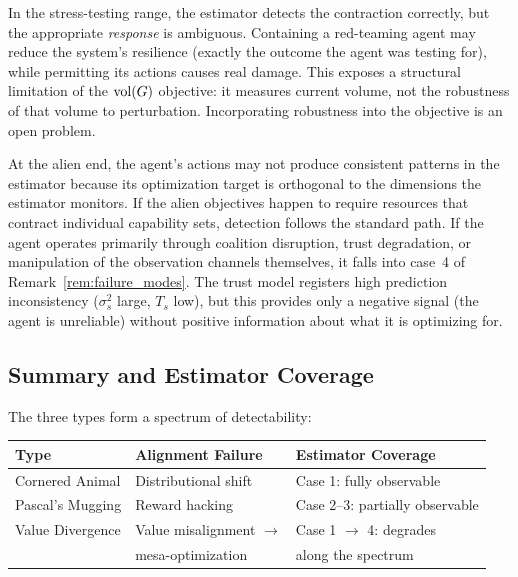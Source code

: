 In the stress-testing range, the estimator detects the contraction correctly,
but the appropriate \emph{response} is ambiguous. Containing a red-teaming
agent may reduce the system's resilience (exactly the outcome the agent was
testing for), while permitting its actions causes real damage. This exposes a
structural limitation of the $\operatorname{vol}(G)$ objective: it measures current volume,
not the robustness of that volume to perturbation. Incorporating robustness
into the objective is an open problem.

At the alien end, the agent's actions may not produce consistent patterns in
the estimator because its optimization target is orthogonal to the dimensions
the estimator monitors. If the alien objectives happen to require resources
that contract individual capability sets, detection follows the standard path.
If the agent operates primarily through coalition disruption, trust degradation,
or manipulation of the observation channels themselves, it falls into case~4 of
Remark~\ref{rem:failure_modes}. The trust model registers high prediction
inconsistency ($\sigma_s^2$ large, $T_s$ low), but this provides only a
negative signal (the agent is unreliable) without positive information about
what it is optimizing for.


\subsection{Summary and Estimator Coverage}
\label{app:scorpion_summary}

The three types form a spectrum of detectability:

\begin{center}
\begin{tabular}{@{}lll@{}}
\toprule
\textbf{Type} & \textbf{Alignment Failure} & \textbf{Estimator Coverage} \\
\midrule
Cornered Animal & Distributional shift & Case 1: fully observable \\
Pascal's Mugging & Reward hacking & Case 2--3: partially observable \\
Value Divergence & Value misalignment $\to$ & Case 1 $\to$ 4: degrades \\
 & mesa-optimization & along the spectrum \\
\bottomrule
\end{tabular}
\end{center}

